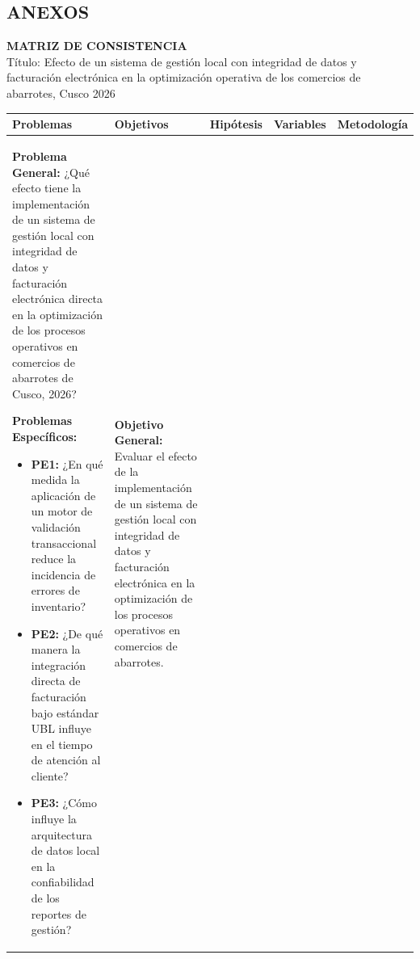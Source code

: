 \begin{landscape}
\thispagestyle{empty}

\section*{ANEXOS}

\begin{center}
    \textbf{\Large MATRIZ DE CONSISTENCIA} \\
    \vspace{0.2cm}
    \small Título: Efecto de un sistema de gestión local con integridad de datos y facturación electrónica en la optimización operativa de los comercios de abarrotes, Cusco 2026
\end{center}

\vspace{0.3cm}

\noindent
\begin{tabularx}{\linewidth}{|Y|Y|Y|Y|Y|}
\hline
{} 
\textbf{Problemas} & \textbf{Objetivos} & \textbf{Hipótesis} & \textbf{Variables} & \textbf{Metodología} \\ \hline

\textbf{Problema General:} \newline
¿Qué efecto tiene la implementación de un sistema de gestión local con integridad de datos y facturación electrónica directa en la optimización de los procesos operativos en comercios de abarrotes de Cusco, 2026? \newline

\textbf{Problemas Específicos:}
\begin{itemize}[leftmargin=*, nosep, itemsep=6pt]
    \item \textbf{PE1:} ¿En qué medida la aplicación de un motor de validación transaccional reduce la incidencia de errores de inventario?
    \item \textbf{PE2:} ¿De qué manera la integración directa de facturación bajo estándar UBL influye en el tiempo de atención al cliente?
    \item \textbf{PE3:} ¿Cómo influye la arquitectura de datos local en la confiabilidad de los reportes de gestión?
\end{itemize} 
& 
\textbf{Objetivo General:} \newline
Evaluar el efecto de la implementación de un sistema de gestión local con integridad de datos y facturación electrónica en la optimización de los procesos operativos en comercios de abarrotes. \newline


\end{tabularx}
\end{landscape}
